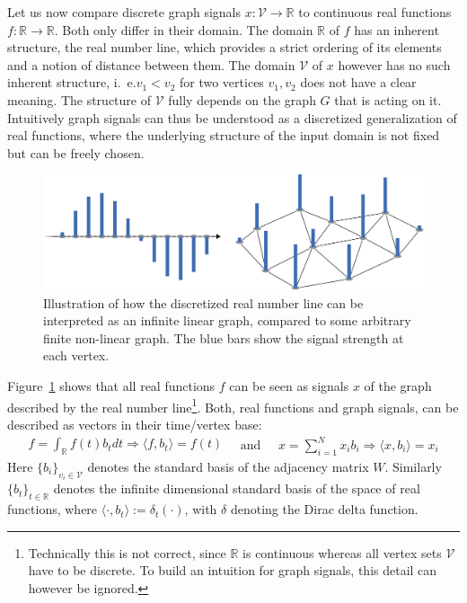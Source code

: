 Let us now compare discrete graph signals $x: \mathcal{V} \to \mathbb{R}$ to continuous real functions $f: \mathbb{R} \to \mathbb{R}$.
Both only differ in their domain.
The domain $\mathbb{R}$ of $f$ has an inherent structure, the real number line, which provides a strict ordering of its elements and a notion of distance between them.
The domain $\mathcal{V}$ of $x$ however has no such inherent structure, i.~e.\@ $v_1 < v_2$ for two vertices $v_1, v_2$ does not have a clear meaning.
The structure of $\mathcal{V}$ fully depends on the graph $G$ that is acting on it.
Intuitively graph signals can thus be understood as a discretized generalization of real functions, where the underlying structure of the input domain is not fixed but can be freely chosen.
\begin{figure}
	\centering
	\includegraphics[width=0.9\linewidth]{gfx/sgt/real-graph.pdf}
	\caption{
		Illustration of how the discretized real number line can be interpreted as an infinite linear graph, compared to some arbitrary finite non-linear graph.
		The blue bars show the signal strength at each vertex.
	}\label{fig:sgt:real-graph}
\end{figure}
Figure~\ref{fig:sgt:real-graph} shows that all real functions $f$ can be seen as signals $x$ of the graph described by the real number line\footnote{
	Technically this is not correct, since $\mathbb{R}$ is continuous whereas all vertex sets $\mathcal{V}$ have to be discrete.
	To build an intuition for graph signals, this detail can however be ignored.
}.
Both, real functions and graph signals, can be described as vectors in their time/vertex base:
\begin{equation}
	\begin{split}
		f = \int_{\mathbb{R}} f(t) b_t dt
		\Rightarrow \langle f, b_t \rangle = f(t)
	\end{split}
	\quad\text{and}\quad
	\begin{split}
		x = \sum_{i = 1}^{N} x_i b_i
		\Rightarrow \langle x, b_i \rangle = x_i
	\end{split}
\end{equation}
Here ${\{ b_i \}}_{v_i \in \mathcal{V}}$ denotes the standard basis of the adjacency matrix $W$.
Similarly ${\{ b_t \}}_{t \in \mathbb{R}}$ denotes the infinite dimensional standard basis of the space of real functions, where $\langle \cdot, b_t \rangle := \delta_t(\cdot)$, with $\delta$ denoting the Dirac delta function.

